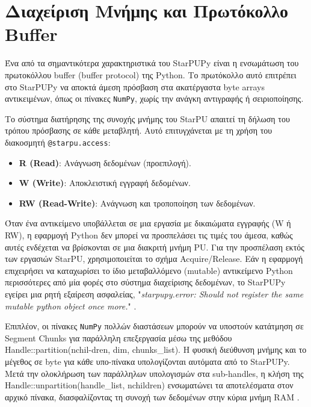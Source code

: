 \section{Διαχείριση Μνήμης και Πρωτόκολλο Buffer}

Ένα από τα σημαντικότερα χαρακτηριστικά του StarPUPy είναι η ενσωμάτωση του 
πρωτοκόλλου buffer (buffer protocol) της Python. Το πρωτόκολλο αυτό επιτρέπει στο 
StarPUPy να αποκτά άμεση πρόσβαση στα ακατέργαστα byte arrays αντικειμένων, όπως οι 
πίνακες \texttt{NumPy}, χωρίς την ανάγκη αντιγραφής ή σειριοποίησης.

Το σύστημα διατήρησης της συνοχής μνήμης του StarPU απαιτεί τη δήλωση του τρόπου 
πρόσβασης σε κάθε μεταβλητή. Αυτό επιτυγχάνεται με τη χρήση του διακοσμητή 
\texttt{@starpu.access}: 

\begin{itemize}
    \item \textbf{R (Read)}: Ανάγνωση δεδομένων (προεπιλογή).
    \item \textbf{W (Write)}: Αποκλειστική εγγραφή δεδομένων.
    \item \textbf{RW (Read-Write)}: Ανάγνωση και τροποποίηση των δεδομένων.
\end{itemize}

Όταν ένα αντικείμενο υποβάλλεται σε μια εργασία με δικαιώματα εγγραφής (W ή RW), η 
εφαρμογή Python δεν μπορεί να προσπελάσει τις τιμές του άμεσα, καθώς αυτές ενδέχεται 
να βρίσκονται σε μια διακριτή μνήμη PU. Για την προσπέλαση εκτός των εργασιών StarPU, 
χρησιμοποιείται το σχήμα Acquire/Release. Εάν η εφαρμογή επιχειρήσει να καταχωρίσει το ίδιο μεταβαλλόμενο (mutable) αντικείμενο Python περισσότερες από μία φορές στο σύστημα διαχείρισης δεδομένων, το StarPUPy εγείρει μια ρητή εξαίρεση ασφαλείας, "\emph{starpupy.error: Should not register the same mutable python object once more.}" \cite{starpu2025handbook}. 

Επιπλέον, οι πίνακες \texttt{NumPy} πολλών διαστάσεων μπορούν να υποστούν κατάτμηση σε Segment Chunks για παράλληλη επεξεργασία μέσω της μεθόδου Handle::partition(nchil-\linebreak dren, dim, chunks\_list). Η φυσική διεύθυνση μνήμης και το μέγεθος σε byte για κάθε υπο-πίνακα υπολογίζονται αυτόματα από το StarPUPy. Μετά την ολοκλήρωση των παράλληλων υπολογισμών στα sub-handles, η κλήση της Handle::unpartition(handle\_list, nchildren) ενσωματώνει τα αποτελέσματα στον αρχικό πίνακα, διασφαλίζοντας τη συνοχή των δεδομένων στην κύρια μνήμη RAM \cite{starpu2025handbook}.

